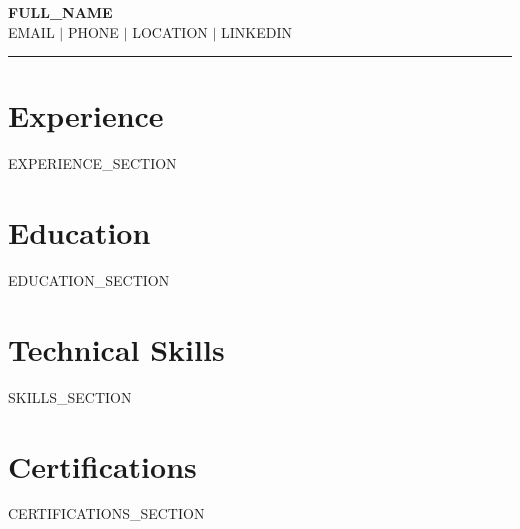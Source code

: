 \documentclass[11pt,a4paper]{article}
\begin{document}
\begin{center}
    {\Large \textbf{{{FULL_NAME}}}}\\[4pt]
    {{EMAIL}} $|$ {{PHONE}} $|$ {{LOCATION}} $|$ {{LINKEDIN}}\\
    \rule{\textwidth}{0.5pt}
\end{center}
\vspace{8pt}

\section{Experience}

{{EXPERIENCE_SECTION}}

\section{Education}

{{EDUCATION_SECTION}}

\section{Technical Skills}

{{SKILLS_SECTION}}

\section{Certifications}

{{CERTIFICATIONS_SECTION}}
\end{document}
